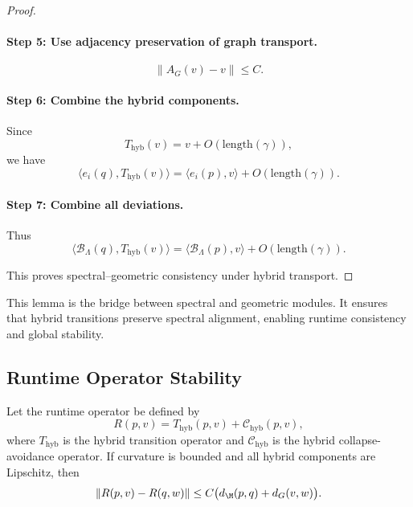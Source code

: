 \begin{proof}
\paragraph{Step 5: Use adjacency preservation of graph transport.}
\[
\|A_G(v) - v\| \le C.
\]

\paragraph{Step 6: Combine the hybrid components.}
Since
\[
T_{\mathrm{hyb}}(v)
=
v + O(\mathrm{length}(\gamma)),
\]
we have
\[
\langle e_i(q), T_{\mathrm{hyb}}(v) \rangle
=
\langle e_i(p), v \rangle
+ O(\mathrm{length}(\gamma)).
\]

\paragraph{Step 7: Combine all deviations.}
Thus
\[
\langle \mathcal{B}_\Lambda(q), T_{\mathrm{hyb}}(v) \rangle
=
\langle \mathcal{B}_\Lambda(p), v \rangle
+ O(\mathrm{length}(\gamma)).
\]

This proves spectral--geometric consistency under hybrid transport.
\end{proof}

\begin{remark}
This lemma is the bridge between spectral and geometric modules.  
It ensures that hybrid transitions preserve spectral alignment, enabling
runtime consistency and global stability.
\end{remark}

\subsection{Runtime Operator Stability}

\begin{lemma}
Let the runtime operator be defined by
\[
R(p,v)
=
T_{\mathrm{hyb}}(p,v)
+
\mathcal{C}_{\mathrm{hyb}}(p,v),
\]
where $T_{\mathrm{hyb}}$ is the hybrid transition operator and
$\mathcal{C}_{\mathrm{hyb}}$ is the hybrid collapse-avoidance operator.
If curvature is bounded and all hybrid components are Lipschitz, then
\[
\|R(p,v) - R(q,w)\|
\le
C\big(d_\M(p,q) + d_G(v,w)\big).
\]
\end{lemma}

